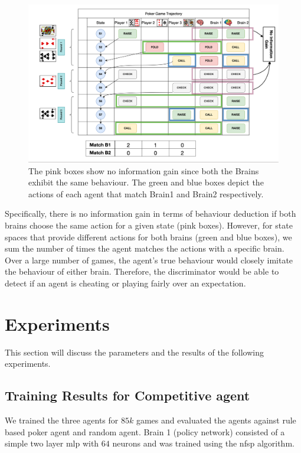 \documentclass{article}
\begin{document}
\begin{figure}[h]
    \centering
    \includegraphics[width=15cm]{./images/discriminator.png}
    \caption{The pink boxes show no information gain since both the Brains exhibit the same behaviour. The green and blue boxes depict the actions of each agent that match Brain1 and Brain2 respectively. }
    \label{fig:cheating}
\end{figure}
Specifically, there is no information gain in terms of behaviour deduction if both brains choose the same action for a given state (pink boxes). However, for state spaces that provide different actions for both brains (green and blue boxes), we sum the number of times the agent matches the actions with a specific brain. Over a large number of games, the agent's true behaviour would closely imitate the behaviour of either brain. Therefore, the discriminator would be able to detect if an agent is cheating or playing fairly over an expectation.

\section{Experiments}
This section will discuss the parameters and the results of the following experiments.

\subsection{Training Results for Competitive agent} %
We trained the three agents for $85k$ games and evaluated the agents against rule based poker agent and random agent. Brain 1 (policy network) consisted of a simple two layer mlp with $64$ neurons and was trained using the nfsp \cite{nsfp:2016} algorithm.
\end{document}
